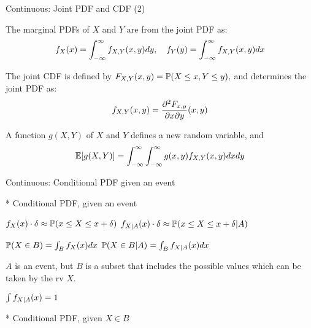 \documentclass[handout,fleqn,aspectratio=169]{beamer}
\begin{document}
\begin{frame}{Continuous: Joint PDF and CDF (2)}

\plitemsep 0.1in
\bce
\item<2->[2.] The marginal PDFs of $X$ and $Y$ are from the joint PDF as: 
$$
f_X(x) = \int_{-\infty}^\infty f_{X,Y}(x,y) dy, \quad f_Y(y) = \int_{-\infty}^\infty f_{X,Y}(x,y) dx
$$

\item<3->[3.] The joint CDF is defined by $F_{X,Y}(x,y) = \mathbb{P}( X \le x, Y \le y ),$ and determines the joint PDF as:
$$
f_{X,Y}(x,y) = \frac{\partial^2 F_{x,y}}{\partial x \partial y} (x,y)
$$

\item<4->[4.] A function $g(X,Y)$ of $X$ and $Y$ defines a new random variable, and
$$
\mathbb{E}[ g(X,Y) ] = \int_{-\infty}^\infty \int_{-\infty}^\infty g(x,y) f_{X,Y}(x,y) dx dy
$$
\ece

\end{frame}

\begin{frame}{Continuous:  Conditional PDF given an event}

{
* Conditional PDF, given an event 

\medskip

\plitemsep 0.15in
\bci 
\item<2-> $f_X(x) \cdot \delta \approx \mathbb{P}( x \le X \le x+\delta )$
$f_{X|A}(x) \cdot \delta \approx \mathbb{P}( x \le X \le x+\delta | A )$

\item<3-> $\mathbb{P}( X \in B ) = \int_B f_X(x) dx$
$\mathbb{P}( X \in B | A ) = \int_B f_{X|A}(x) dx$

\medskip
{} $A$ is an event, but $B$ is a subset that includes the possible values which can be taken by the rv $X.$

\item<4-> $\int f_{X|A}(x) = 1$
\eci
}
{
* Conditional PDF, given $X \in B$

\medskip



}
\end{frame}
\end{document}
